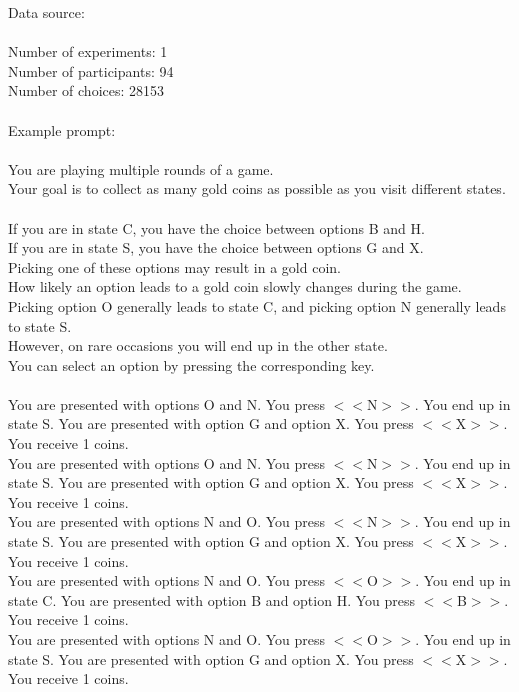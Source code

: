 \documentclass[pdflatex,sn-nature]{sn-jnl}%
\theoremstyle{thmstyleone}%
\theoremstyle{thmstyletwo}%
\theoremstyle{thmstylethree}%
\begin{document}
Data source: \cite{feher2023rethinking} \\ $~$ \\
Number of experiments: 1 $~$\\ 
Number of participants: 94 $~$\\ 
Number of choices: 28153 $~$\\ 
 $~$\\ 
Example prompt: $~$\\ 
 $~$\\ 
 You are playing multiple rounds of a game. $~$\\ 
Your goal is to collect as many gold coins as possible as you visit different states. $~$\\ 
If you are in state C, you have the choice between options B and H. $~$\\ 
If you are in state S, you have the choice between options G and X. $~$\\ 
Picking one of these options may result in a gold coin. $~$\\ 
How likely an option leads to a gold coin slowly changes during the game. $~$\\ 
Picking option O generally leads to state C, and picking option N generally leads to state S. $~$\\ 
However, on rare occasions you will end up in the other state. $~$\\ 
You can select an option by pressing the corresponding key. $~$\\ 
 $~$\\ 
You are presented with options O and N. You press $<<$N$>>$. You end up in state S. You are presented with option G and option X. You press $<<$X$>>$. You receive 1 coins. $~$\\ 
You are presented with options O and N. You press $<<$N$>>$. You end up in state S. You are presented with option G and option X. You press $<<$X$>>$. You receive 1 coins. $~$\\ 
You are presented with options N and O. You press $<<$N$>>$. You end up in state S. You are presented with option G and option X. You press $<<$X$>>$. You receive 1 coins. $~$\\ 
You are presented with options N and O. You press $<<$O$>>$. You end up in state C. You are presented with option B and option H. You press $<<$B$>>$. You receive 1 coins. $~$\\ 
You are presented with options N and O. You press $<<$O$>>$. You end up in state S. You are presented with option G and option X. You press $<<$X$>>$. You receive 1 coins. $~$\\ 
\end{document}
